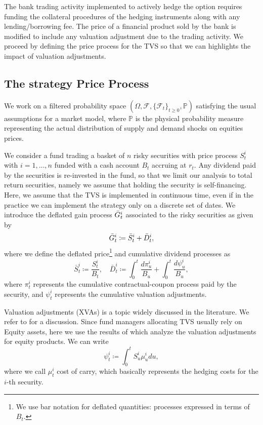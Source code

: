 \documentclass[11pt]{article}
\begin{document}
The bank trading activity implemented to actively hedge the option requires funding the collateral procedures of the hedging instruments along with any lending/borrowing fee. The price of a financial product sold by the bank is modified to include any valuation adjustment due to the trading activity. We proceed by defining the price process for the TVS so that we can highlights the impact of valuation adjustments.
\subsection{The strategy Price Process}
We work on a filtered probability space $\left(\Omega, \mathcal{F}, \{\mathcal{F}_t\}_{t\geq0}, \mathbb{P}  \right)$ satisfying the usual assumptions for a market model, where $\mathbb{P}$ is the physical probability measure representing the actual distribution of supply and demand shocks on equities prices. 

We consider a fund trading a basket of $n$ risky securities with price process $S_t^i$ with $i=1,\dots,n$ funded with a cash account $B_t$ accruing at $r_t$. Any dividend paid by the securities is re-invested in the fund, so that we limit our analysis to total return securities, namely we assume that holding the security is self-financing. Here, we assume that the TVS is implemented in continuous time, even if in the practice we can implement the strategy only on a discrete set of dates. We introduce the deflated gain process $\Bar{G}_t^i$ associated to the risky securities as given by
\begin{equation}
    \Bar{G}_t^i \coloneqq \Bar{S}_t^i + \Bar{D}_t^i,
\end{equation}
where we define the deflated price\footnote{We use bar notation for deflated quantities: processes expressed in terms of $B_t$.} and cumulative dividend processes as 
\begin{equation}
    \bar{S}_t^i \coloneqq \frac{S_t^i}{B_t}, \quad \bar{D}^i_t \coloneqq \int_0^t\frac{d\pi_u^i}{B_u} + \int_0^t\frac{d\psi_u^i}{B_u},
\end{equation}
where $\pi^i_t$ represents the cumulative contractual-coupon process paid by the security, and $\psi_t^i$ represents the cumulative valuation adjustments.

Valuation adjustments (XVAs) is a topic widely discussed in the literature. We refer to \cite{Brigo} for a discussion. Since fund managers allocating TVS usually rely on Equity assets, here we use the results of \cite{Gabrielli} which  analyze the valuation adjustments for equity products. We can write
\begin{equation}
    \psi_t^i \coloneqq \int_0^t S_u^i\mu_u^i du,
\label{eq:XVA_equity}\end{equation}
where we call $\mu_t^i$ cost of carry, which basically represents the hedging costs for the $i$-th security.
\end{document}
